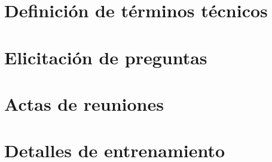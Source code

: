 \documentclass[a4page, 11pt, showtrims]{memoir}
\begin{document}

\appendix
\renewcommand{\thesection}{A.\arabic{section}}
\renewcommand{\thesubsection}{A.\arabic{section}.\arabic{subsection}}
\setcounter{section}{0}
\setcounter{subsection}{0}
\chapter{Definición de términos técnicos}

\chapter{Elicitación de preguntas}

\chapter{Actas de reuniones}

\chapter{Detalles de entrenamiento}




\end{document}
